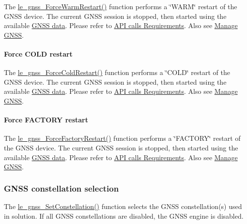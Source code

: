The \hyperlink{le__gnss__interface_8h_a1f5b3008db50d34c7962fb73c306f3d1}{le\+\_\+gnss\+\_\+\+Force\+Warm\+Restart()} function performs a \char`\"{}\+W\+A\+R\+M\char`\"{} restart of the G\+N\+S\+S device. The current G\+N\+S\+S session is stopped, then started using the available \hyperlink{c_gnss_le_gnss_Data}{G\+N\+S\+S data}. Please refer to \hyperlink{c_gnss_le_gnss_APIcallsRequirements}{A\+P\+I calls Requirements}. Also see \hyperlink{howToGNSS}{Manage G\+N\+S\+S}.\hypertarget{c_gnss_le_gnss_ForceColdRestart}{}\paragraph{Force C\+O\+L\+D restart}\label{c_gnss_le_gnss_ForceColdRestart}
The \hyperlink{le__gnss__interface_8h_aa702703bbeebbefd65dd51b1f9fd4ce5}{le\+\_\+gnss\+\_\+\+Force\+Cold\+Restart()} function performs a \char`\"{}\+C\+O\+L\+D\char`\"{} restart of the G\+N\+S\+S device. The current G\+N\+S\+S session is stopped, then started using the available \hyperlink{c_gnss_le_gnss_Data}{G\+N\+S\+S data}. Please refer to \hyperlink{c_gnss_le_gnss_APIcallsRequirements}{A\+P\+I calls Requirements}. Also see \hyperlink{howToGNSS}{Manage G\+N\+S\+S}.\hypertarget{c_gnss_le_gnss_ForceFactoryRestart}{}\paragraph{Force F\+A\+C\+T\+O\+R\+Y restart}\label{c_gnss_le_gnss_ForceFactoryRestart}
The \hyperlink{le__gnss__interface_8h_a18219097f3e8c8e6e613462a5467f546}{le\+\_\+gnss\+\_\+\+Force\+Factory\+Restart()} function performs a \char`\"{}\+F\+A\+C\+T\+O\+R\+Y\char`\"{} restart of the G\+N\+S\+S device. The current G\+N\+S\+S session is stopped, then started using the available \hyperlink{c_gnss_le_gnss_Data}{G\+N\+S\+S data}. Please refer to \hyperlink{c_gnss_le_gnss_APIcallsRequirements}{A\+P\+I calls Requirements}. Also see \hyperlink{howToGNSS}{Manage G\+N\+S\+S}.\hypertarget{c_gnss_le_gnss_SetGetConstellation}{}\subsubsection{G\+N\+S\+S constellation selection}\label{c_gnss_le_gnss_SetGetConstellation}
The \hyperlink{le__gnss__interface_8h_a6dbdc58f23e480e65ea16c583ef5340f}{le\+\_\+gnss\+\_\+\+Set\+Constellation()} function selects the G\+N\+S\+S constellation(s) used in solution. If all G\+N\+S\+S constellations are disabled, the G\+N\+S\+S engine is disabled.

